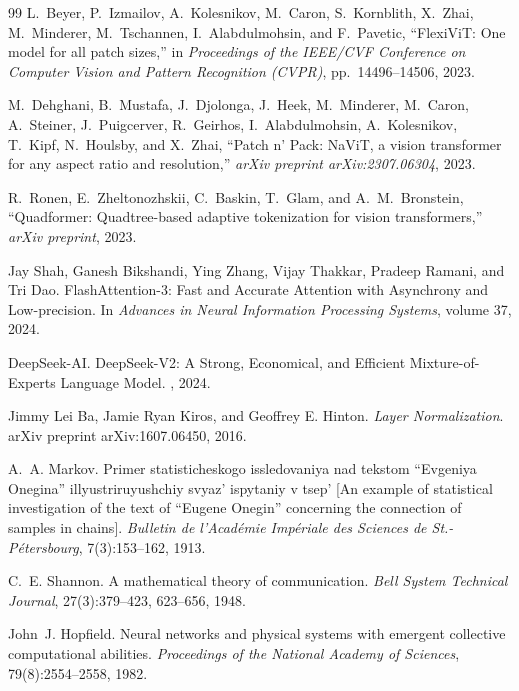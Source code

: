 \documentclass{book}
\begin{document}
\begin{thebibliography}{99}
L.~Beyer, P.~Izmailov, A.~Kolesnikov, M.~Caron, S.~Kornblith, X.~Zhai,
M.~Minderer, M.~Tschannen, I.~Alabdulmohsin, and F.~Pavetic,
``{FlexiViT}: One model for all patch sizes,''
in \textit{Proceedings of the IEEE/CVF Conference on Computer Vision and
Pattern Recognition (CVPR)}, pp.~14496--14506, 2023.

M.~Dehghani, B.~Mustafa, J.~Djolonga, J.~Heek, M.~Minderer, M.~Caron,
A.~Steiner, J.~Puigcerver, R.~Geirhos, I.~Alabdulmohsin, A.~Kolesnikov,
T.~Kipf, N.~Houlsby, and X.~Zhai,
``Patch n' Pack: {NaViT}, a vision transformer for any aspect ratio and
resolution,''
\textit{arXiv preprint arXiv:2307.06304}, 2023.

R.~Ronen, E.~Zheltonozhskii, C.~Baskin, T.~Glam, and A.~M.~Bronstein,
``Quadformer: Quadtree-based adaptive tokenization for vision transformers,''
\textit{arXiv preprint}, 2023.

Jay Shah, Ganesh Bikshandi, Ying Zhang, Vijay Thakkar, Pradeep Ramani, and Tri Dao.
\newblock FlashAttention-3: Fast and Accurate Attention with Asynchrony and Low-precision.
\newblock In {\em Advances in Neural Information Processing Systems}, volume 37, 2024.

DeepSeek-AI.
\newblock DeepSeek-V2: A Strong, Economical, and Efficient Mixture-of-Experts Language Model.
, 2024.


Jimmy Lei Ba, Jamie Ryan Kiros, and Geoffrey E. Hinton.
\textit{Layer Normalization}.
arXiv preprint arXiv:1607.06450, 2016.

A.~A. Markov.
\newblock Primer statisticheskogo issledovaniya nad tekstom ``{E}vgeniya
  {O}negina'' illyustriruyushchiy svyaz' ispytaniy v tsep' [An example of
  statistical investigation of the text of ``{E}ugene {O}negin'' concerning the
  connection of samples in chains].
\newblock \textit{Bulletin de l'Acad{\'e}mie Imp{\'e}riale des Sciences de
  St.-P{\'e}tersbourg}, 7(3):153--162, 1913.

C.~E. Shannon.
\newblock A mathematical theory of communication.
\newblock \textit{Bell System Technical Journal}, 27(3):379--423, 623--656, 1948.


John~J. Hopfield.
\newblock Neural networks and physical systems with emergent collective
  computational abilities.
\newblock \textit{Proceedings of the National Academy of Sciences},
  79(8):2554--2558, 1982.


\end{thebibliography}
\end{document}
